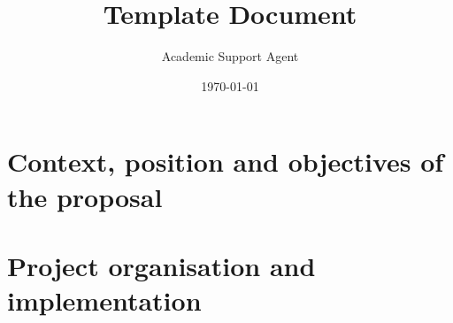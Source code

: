 \documentclass{article}
\title{Template Document}
\author{Academic Support Agent}
\date{\today}
\begin{document}
\maketitle

\maketitle
\thispagestyle{fancy}
\section{Context, position and objectives of the proposal}

\section{Project organisation and implementation}
\end{document}
